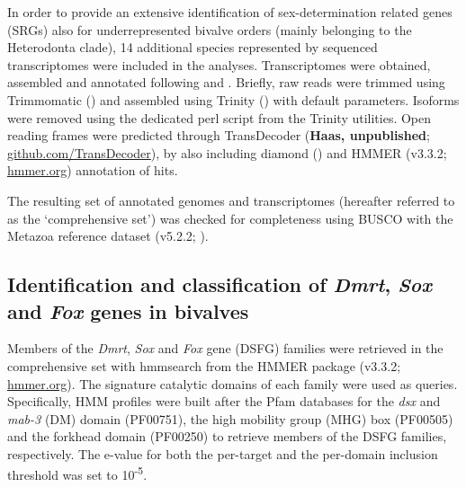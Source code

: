 \documentclass[../main.tex]{subfiles}
\begin{document}
In order to provide an extensive identification of sex-determination related genes (SRGs) also for underrepresented bivalve orders (mainly belonging to the Heterodonta clade), 14 additional species represented by sequenced transcriptomes were included in the analyses. Transcriptomes were obtained, assembled and annotated following \textbf{\cite{piccinini2021mitonuclear}} and \textbf{\cite{iannello2023signatures}}. Briefly, raw reads were trimmed using Trimmomatic (\textbf{\cite{bolger2014trimmomatic}}) and assembled using Trinity (\textbf{\cite{grabherr2011trinity}}) with default parameters. Isoforms were removed using the dedicated perl script from the Trinity utilities. Open reading frames were predicted through TransDecoder (\textbf{Haas, unpublished}; \href{https://github.com/TransDecoder/TransDecoder}{github.com/TransDecoder}), by also including diamond (\textbf{\cite{buchfink2015fast}}) and HMMER (v3.3.2; \href{http://hmmer.org/}{hmmer.org}) annotation of hits.

The resulting set of annotated genomes and transcriptomes (hereafter referred to as the ‘comprehensive set’) was checked for completeness using BUSCO with the Metazoa reference dataset (v5.2.2; \textbf{\cite{manni2021busco}}).

\subsection{Identification and classification of \textit{Dmrt}, \textit{Sox} and \textit{Fox} genes in bivalves}
Members of the \textit{Dmrt}, \textit{Sox} and \textit{Fox} gene (DSFG) families were retrieved in the comprehensive set with hmmsearch from the HMMER package (v3.3.2; \href{http://hmmer.org/}{hmmer.org}). The signature catalytic domains of each family were used as queries. Specifically, HMM profiles were built after the Pfam databases for the \textit{dsx} and \textit{mab-3} (DM) domain (PF00751), the high mobility group (MHG) box (PF00505) and the forkhead domain (PF00250) to retrieve members of the DSFG families, respectively. The e-value for both the per-target and the per-domain inclusion threshold was set to 10\textsuperscript{-5}.
\end{document}
